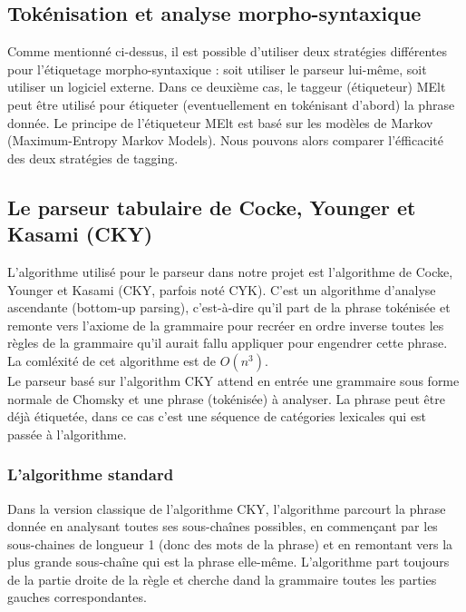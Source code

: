 \documentclass[12pt]{article}
\begin{document}
\subsection{Tok\'enisation et analyse morpho-syntaxique}

Comme mentionn\'e ci-dessus, il est possible d'utiliser deux strat\'egies
diff\'erentes pour l'\'etiquetage morpho-syntaxique : soit utiliser le parseur
lui-m\^eme, soit utiliser un logiciel externe. Dans ce deuxi\`eme cas, le taggeur
(\'etiqueteur) MElt \cite{MElt} peut \^etre utilis\'e pour \'etiqueter (eventuellement
en tok\'enisant d'abord) la phrase donn\'ee. Le principe de l'\'etiqueteur MElt est
bas\'e sur les mod\`eles de Markov (Maximum-Entropy Markov Models). 
Nous pouvons alors comparer l'\'efficacit\'e des deux strat\'egies de tagging.

\subsection{Le parseur tabulaire de Cocke, Younger et Kasami (CKY)}

L'algorithme utilis\'e pour le parseur dans notre projet est l'algorithme de
Cocke, Younger et Kasami (CKY, parfois not\'e CYK). C'est un algorithme d'analyse
ascendante (bottom-up parsing), c'est-\`a-dire qu'il part de la phrase tok\'enis\'ee
et remonte vers l'axiome de la grammaire pour recr\'eer en ordre inverse toutes les r\`egles de la grammaire qu'il
aurait fallu appliquer pour engendrer cette phrase. La coml\'exit\'e de cet
algorithme est de $O(n^3)$. \\

Le parseur bas\'e sur l'algorithm CKY attend en entr\'ee une grammaire sous forme
normale de Chomsky et une phrase (tok\'enis\'ee) \`a analyser. La phrase peut \^etre
d\'ej\`a \'etiquet\'ee, dans ce cas c'est une s\'equence de cat\'egories lexicales qui est
pass\'ee \`a l'algorithme.

\subsubsection{L'algorithme standard}
Dans la version classique de l'algorithme CKY, l'algorithme parcourt la phrase
donn\'ee en analysant toutes ses sous-cha\^ines possibles, en commençant par les
sous-chaines de longueur 1 (donc des mots de la phrase) et en remontant vers la
plus grande sous-cha\^ine qui est la phrase elle-m\^eme. L'algorithme
part toujours de la partie droite de la r\`egle et cherche dand la
grammaire toutes les parties gauches correspondantes. \\
\end{document}
